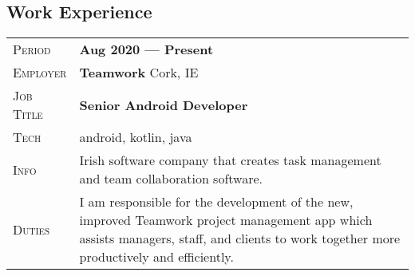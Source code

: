 \documentclass[a4paper, oneside, final]{scrartcl} %
\newcommand{\gray}{\rowcolor[gray]{.90}} %
\newcommand{\subSecHeadWidth}{2.1cm}
\begin{document}
\begin{center}

\section{Work Experience}


\begin{tabularx}{0.97\linewidth}{>{\raggedleft\scshape}p{\subSecHeadWidth}X}
\gray Period & \textbf{Aug 2020 --- Present}\\
\gray Employer & \textbf{Teamwork} \hfill Cork, IE\\
\gray Job Title & \textbf{Senior Android Developer}\\
\gray Tech & android, kotlin, java\\
Info & Irish software company that creates task management and team collaboration software. \\
Duties & I am responsible for the development of the new, improved Teamwork project management app which assists managers, staff, and clients to work together more productively and efficiently. 
\end{tabularx}

\vspace{12pt}



\end{center}
\end{document}
